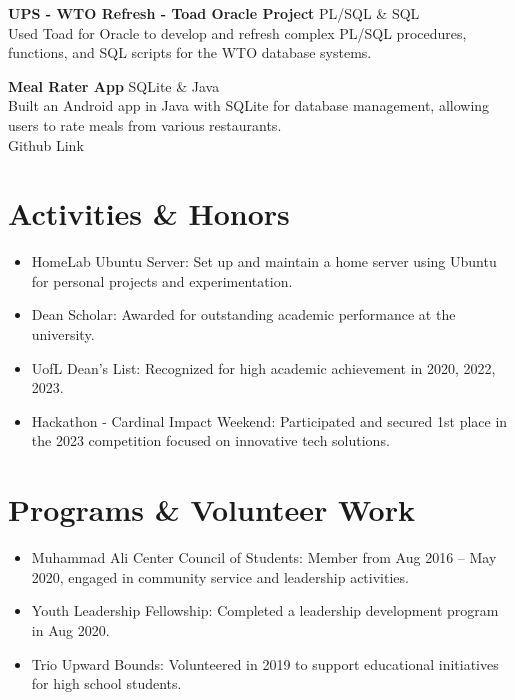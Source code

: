 \documentclass{article}
\begin{document}
\textbf{UPS - WTO Refresh - Toad Oracle Project} \hfill PL/SQL \& SQL\\
Used Toad for Oracle to develop and refresh complex PL/SQL procedures, functions, and SQL scripts for the WTO database systems.

\textbf{Meal Rater App} \hfill SQLite \& Java\\
Built an Android app in Java with SQLite for database management, allowing users to rate meals from various restaurants.\\
Github Link

\section*{Activities \& Honors}
\begin{itemize}
   \item HomeLab Ubuntu Server: Set up and maintain a home server using Ubuntu for personal projects and experimentation.
   \item Dean Scholar: Awarded for outstanding academic performance at the university.
   \item UofL Dean's List: Recognized for high academic achievement in 2020, 2022, 2023.
   \item Hackathon - Cardinal Impact Weekend: Participated and secured 1st place in the 2023 competition focused on innovative tech solutions.
\end{itemize}

\section*{Programs \& Volunteer Work}
\begin{itemize}
   \item Muhammad Ali Center Council of Students: Member from Aug 2016 -- May 2020, engaged in community service and leadership activities.
   \item Youth Leadership Fellowship: Completed a leadership development program in Aug 2020.
   \item Trio Upward Bounds: Volunteered in 2019 to support educational initiatives for high school students.
\end{itemize}
\end{document}

